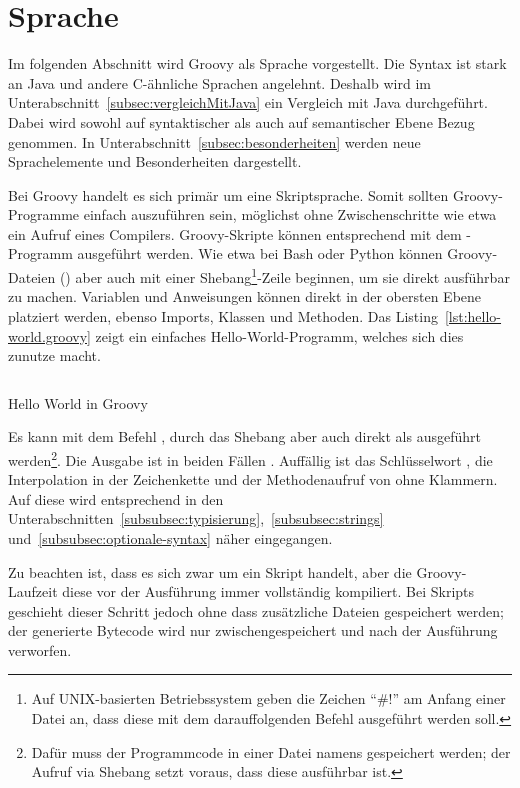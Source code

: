 \documentclass[a4paper]{article}
\newcommand{\codelisting}[3]{
\begin{listing}[ht]
	\inputminted{#1}{#1/#2}
	\caption{#3}
	\label{lst:#2}
\end{listing}
}
\begin{document}

\section{Sprache}\label{sec:sprache}

Im folgenden Abschnitt wird Groovy als Sprache vorgestellt.
Die Syntax ist stark an Java und andere C-ähnliche Sprachen angelehnt.
Deshalb wird im Unterabschnitt~\ref{subsec:vergleichMitJava} ein Vergleich mit Java durchgeführt.
Dabei wird sowohl auf syntaktischer als auch auf semantischer Ebene Bezug genommen.
In Unterabschnitt~\ref{subsec:besonderheiten} werden neue Sprachelemente und Besonderheiten dargestellt.

Bei Groovy handelt es sich primär um eine Skriptsprache.
Somit sollten Groovy-Programme einfach auszuführen sein, möglichst ohne Zwischenschritte wie etwa ein Aufruf eines Compilers.
Groovy-Skripte können entsprechend mit dem -Programm ausgeführt werden.
Wie etwa bei Bash oder Python können Groovy-Dateien () aber auch mit einer Shebang\footnote{Auf UNIX-basierten Betriebssystem geben die Zeichen ``\#!'' am Anfang einer Datei an, dass diese mit dem darauffolgenden Befehl ausgeführt werden soll.}-Zeile beginnen, um sie direkt ausführbar zu machen.
Variablen und Anweisungen können direkt in der obersten Ebene platziert werden, ebenso Imports, Klassen und Methoden.
Das Listing~\ref{lst:hello-world.groovy} zeigt ein einfaches Hello-World-Programm, welches sich dies zunutze macht.

\codelisting{groovy}{hello-world.groovy}{Hello World in Groovy}

Es kann mit dem Befehl , durch das Shebang aber auch direkt als  ausgeführt werden\footnote{Dafür muss der Programmcode in einer Datei namens  gespeichert werden; der Aufruf via Shebang setzt voraus, dass diese ausführbar ist.}.
Die Ausgabe ist in beiden Fällen .
Auffällig ist das Schlüsselwort , die Interpolation in der Zeichenkette und der Methodenaufruf von  ohne Klammern.
Auf diese wird entsprechend in den Unterabschnitten~\ref{subsubsec:typisierung},~\ref{subsubsec:strings} und~\ref{subsubsec:optionale-syntax} näher eingegangen.

Zu beachten ist, dass es sich zwar um ein Skript handelt, aber die Groovy-Laufzeit diese vor der Ausführung immer vollständig kompiliert.
Bei Skripts geschieht dieser Schritt jedoch ohne dass zusätzliche Dateien gespeichert werden;
der generierte Bytecode wird nur zwischengespeichert und nach der Ausführung verworfen.
\end{document}
